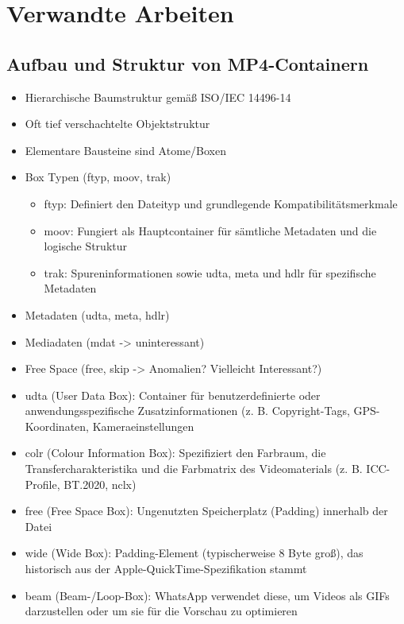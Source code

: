 \chapter{Verwandte Arbeiten}




\section{Aufbau und Struktur von MP4-Containern}

\begin{itemize}
    \item Hierarchische Baumstruktur gemäß ISO/IEC 14496-14
    \item Oft tief verschachtelte Objektstruktur
    \item Elementare Bausteine sind Atome/Boxen
    \item Box Typen (ftyp, moov, trak)
    \begin{itemize}
        \item ftyp: Definiert den Dateityp und grundlegende Kompatibilitätsmerkmale
        \item moov: Fungiert als Hauptcontainer für sämtliche Metadaten und die logische Struktur
        \item trak: Spureninformationen sowie udta, meta und hdlr für spezifische Metadaten
    \end{itemize}
    \item Metadaten (udta, meta, hdlr)
    \item Mediadaten (mdat -> uninteressant)
    \item Free Space (free, skip -> Anomalien? Vielleicht Interessant?)

    \item udta (User Data Box): Container für benutzerdefinierte oder anwendungsspezifische Zusatzinformationen (z. B. Copyright-Tags, GPS-Koordinaten, Kameraeinstellungen
    \item colr (Colour Information Box): Spezifiziert den Farbraum, die Transfercharakteristika und die Farbmatrix des Videomaterials (z. B. ICC-Profile, BT.2020, nclx)
    \item free (Free Space Box): Ungenutzten Speicherplatz (Padding) innerhalb der Datei
    \item wide (Wide Box): Padding-Element (typischerweise 8 Byte groß), das historisch aus der Apple-QuickTime-Spezifikation stammt
    \item beam (Beam-/Loop-Box): WhatsApp verwendet diese, um Videos als GIFs darzustellen oder um sie für die Vorschau zu optimieren
\end{itemize}

